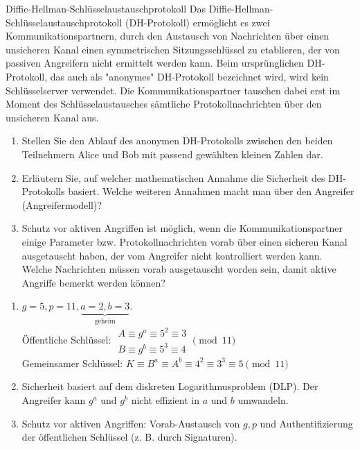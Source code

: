 \documentclass{article}
\begin{document}
\begin{exercise}{Diffie-Hellman-Schlüsselaustauschprotokoll}
  Das Diffie-Hellman-Schlüsselaustauschprotokoll (DH-Protokoll) ermöglicht es zwei Kommunikationspartnern, durch den Austausch von Nachrichten über einen unsicheren Kanal einen symmetrischen Sitzungsschlüssel zu etablieren, der von passiven Angreifern nicht ermittelt werden kann. Beim ursprünglichen DH-Protokoll, das auch als "anonymes" DH-Protokoll bezeichnet wird, wird kein Schlüsselserver verwendet. Die Kommunikationspartner tauschen dabei erst im Moment des Schlüsselaustausches sämtliche Protokollnachrichten über den unsicheren Kanal aus.
  \begin{enumerate}
    \item Stellen Sie den Ablauf des anonymen DH-Protokolls zwischen den beiden Teilnehmern Alice und Bob mit passend gewählten kleinen Zahlen dar.
    \item Erläutern Sie, auf welcher mathematischen Annahme die Sicherheit des DH-Protokolls basiert. Welche weiteren Annahmen macht man über den Angreifer (Angreifermodell)?
    \item Schutz vor aktiven Angriffen ist möglich, wenn die Kommunikationspartner einige Parameter bzw. Protokollnachrichten vorab über einen sicheren Kanal ausgetauscht haben, der vom Angreifer nicht kontrolliert werden kann. Welche Nachrichten müssen vorab ausgetauscht worden sein, damit aktive Angriffe bemerkt werden können?
  \end{enumerate}

  \begin{solution}
    \begin{enumerate}
        \item $g=5, p=11, \underbrace{a=2, b=3}_\text{geheim}$.\\
          Öffentliche Schlüssel: $\begin{array}{l}
              A\equiv g^a \equiv 5^2 \equiv 3\\
              B\equiv g^b \equiv 5^3 \equiv 4
            \end{array} \pmod{11}$\\
          Gemeinsamer Schlüssel: $K\equiv B^a\equiv A^b\equiv 4^2\equiv 3^3\equiv 5 \pmod{11}$
        \item Sicherheit basiert auf dem diskreten Logarithmusproblem (DLP). Der Angreifer kann $g^a$ und $g^b$ nicht effizient in $a$ und $b$ umwandeln.
        \item Schutz vor aktiven Angriffen: Vorab-Austausch von $g, p$ und Authentifizierung der öffentlichen Schlüssel (z. B. durch Signaturen).
    \end{enumerate}
  \end{solution}
\end{exercise}
\end{document}
